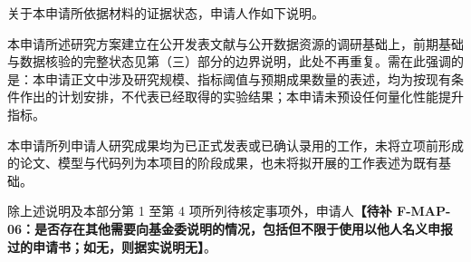\justifying
\NSFCBodyText

关于本申请所依据材料的证据状态，申请人作如下说明。

本申请所述研究方案建立在公开发表文献与公开数据资源的调研基础上，前期基础与数据核验的完整状态见第（三）部分的边界说明，此处不再重复。需在此强调的是：本申请正文中涉及研究规模、指标阈值与预期成果数量的表述，均为按现有条件作出的计划安排，不代表已经取得的实验结果；本申请未预设任何量化性能提升指标。

本申请所列申请人研究成果均为已正式发表或已确认录用的工作，未将立项前形成的论文、模型与代码列为本项目的阶段成果，也未将拟开展的工作表述为既有基础。

除上述说明及本部分第 1 至第 4 项所列待核定事项外，申请人\textbf{【待补 F-MAP-06：是否存在其他需要向基金委说明的情况，包括但不限于使用以他人名义申报过的申请书；如无，则据实说明无】}。
